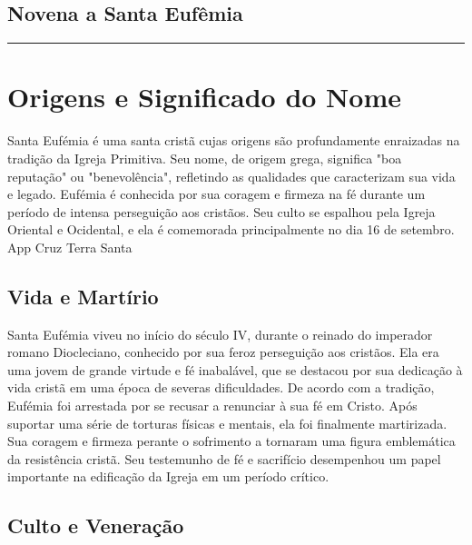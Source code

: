 \documentclass[a4paper,14pt]{extarticle} \usepackage[utf8]{inputenc}
\begin{document}
\subsection*{Novena a Santa Eufêmia}


\par\noindent\rule{\textwidth}{0.4pt}

\tableofcontents
\thispagestyle{empty}

\newpage

\section{ Origens e Significado do Nome}

Santa Eufémia é uma santa cristã cujas origens são profundamente enraizadas na tradição da Igreja Primitiva. Seu nome, de origem grega, significa "boa reputação" ou "benevolência", refletindo as qualidades que caracterizam sua vida e legado. Eufémia é conhecida por sua coragem e firmeza na fé durante um período de intensa perseguição aos cristãos. Seu culto se espalhou pela Igreja Oriental e Ocidental, e ela é comemorada principalmente no dia 16 de setembro.
App Cruz Terra Santa

\subsection{Vida e Martírio}

Santa Eufémia viveu no início do século IV, durante o reinado do imperador romano Diocleciano, conhecido por sua feroz perseguição aos cristãos. Ela era uma jovem de grande virtude e fé inabalável, que se destacou por sua dedicação à vida cristã em uma época de severas dificuldades.
De acordo com a tradição, Eufémia foi arrestada por se recusar a renunciar à sua fé em Cristo. Após suportar uma série de torturas físicas e mentais, ela foi finalmente martirizada. Sua coragem e firmeza perante o sofrimento a tornaram uma figura emblemática da resistência cristã. Seu testemunho de fé e sacrifício desempenhou um papel importante na edificação da Igreja em um período crítico.
\subsection{Culto e Veneração}
\end{document}
